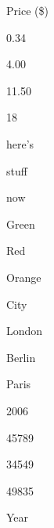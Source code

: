\documentclass[a4paper,portrait,12pt]{article}
\begin{document}
\begin{flushleft}
Price (\$)
\end{flushleft}


0.34


4.00


11.50


18





\begin{flushleft}
here's
\end{flushleft}


\begin{flushleft}
stuff
\end{flushleft}


\begin{flushleft}
now
\end{flushleft}





\begin{flushleft}
Green
\end{flushleft}


\begin{flushleft}
Red
\end{flushleft}


\begin{flushleft}
Orange
\end{flushleft}





\begin{flushleft}
\newpage
City
\end{flushleft}


\begin{flushleft}
London
\end{flushleft}


\begin{flushleft}
Berlin
\end{flushleft}


\begin{flushleft}
Paris
\end{flushleft}





2006


45789


34549


49835





\begin{flushleft}
Year
\end{flushleft}
\end{document}
